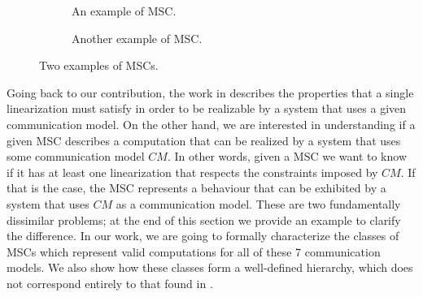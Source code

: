 \begin{figure}[h]
	\captionsetup[subfigure]{justification=centering}
	\begin{subfigure}[t]{0.45\textwidth}\centering
		\caption{An example of MSC.}
	\end{subfigure}
	\begin{subfigure}[t]{0.45\textwidth}\centering
		\caption{Another example of MSC.}
	\end{subfigure}
		\caption{Two examples of MSCs.}
	    \label{fig:msc_ex}
\end{figure}



Going back to our contribution, the work in \cite{DBLP:journals/fac/ChevrouHQ16} describes the properties that a single linearization must satisfy in order to be realizable by a system that uses a given communication model. On the other hand, we are interested in understanding if a given MSC describes a computation that can be realized by a system that uses some communication model $CM$. In other words, given a MSC we want to know if it has at least one linearization that respects the constraints imposed by $CM$. If that is the case, the MSC represents a behaviour that can be exhibited by a system that uses $CM$ as a communication model. These are two fundamentally dissimilar problems; at the end of this section we provide an example to clarify the difference. In our work, we are going to formally characterize the classes of MSCs which represent valid computations for all of these 7 communication models. We also show how these classes form a well-defined hierarchy, which does not correspond entirely to that found in \cite{DBLP:journals/fac/ChevrouHQ16}.



